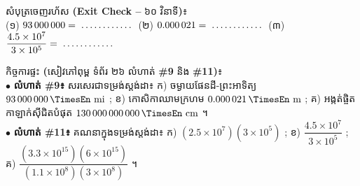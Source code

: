 \documentclass[a4paper,10pt]{article}
\newcommand{\en}[1]{{\TimesEn #1}}
\newcommand{\enbf}[1]{{\TimesEn\bfseries #1}}
\newcommand{\unit}[1]{\,\text{\en{#1}}}
\newcommand{\blank}[1][1.5cm]{\makebox[#1]{\dotfill}}
\begin{document}
\vspace{5pt}
\begin{tcolorbox}[enhanced, sharp corners, colback=white, colframe=black, boxrule=0.85pt, boxsep=2.5pt, top=3.5pt, bottom=3.5pt, left=5pt, right=5pt]
  {\muol\fontsize{8.8pt}{12.5pt}\selectfont សំបុត្រចេញរហ័ស \enbf{(Exit Check --} ៦០ វិនាទី\enbf{)}៖}\\[2pt]
  (១) $93\,000\,000 = \blank[2.0cm]$ \quad \en{|} \quad
  (២) $0.000\,021 = \blank[2.0cm]$ \quad \en{|} \quad
  (៣) $\dfrac{4.5\times 10^7}{3\times 10^5} = \blank[2.0cm]$
\end{tcolorbox}

\vspace{5pt}
\begin{tcolorbox}[enhanced, sharp corners, colback=panelgray, colframe=black, boxrule=0.85pt, boxsep=2.5pt, top=3.5pt, bottom=3.5pt, left=5pt, right=5pt]
  {\muol\fontsize{8.8pt}{12.5pt}\selectfont កិច្ចការផ្ទះ \enbf{(}សៀវភៅពុម្ព ទំព័រ ២៦ លំហាត់ \enbf{\#9} និង \enbf{\#11)}៖}\\[2pt]
  $\bullet$ \textbf{លំហាត់ \#9៖} សរសេរជាទម្រង់ស្តង់ដា៖ ក) ចម្ងាយផែនដី-ព្រះអាទិត្យ $93\,000\,000\unit{mi}$ ; ខ) កោសិកាឈាមក្រហម $0.000\,021\unit{m}$ ; គ) អង្កត់ផ្ចិតកាឡាក់ស៊ីជិតបំផុត $130\,000\,000\,000\unit{cm}$ ។\\
  $\bullet$ \textbf{លំហាត់ \#11៖} គណនាក្នុងទម្រង់ស្តង់ដា៖ ក) $(2.5\times 10^7)(3\times 10^5)$ ; ខ) $\dfrac{4.5\times 10^7}{3\times 10^5}$ ; គ) $\dfrac{(3.3\times 10^{15})(6\times 10^{15})}{(1.1\times 10^8)(3\times 10^8)}$ ។
\end{tcolorbox}
\end{document}
